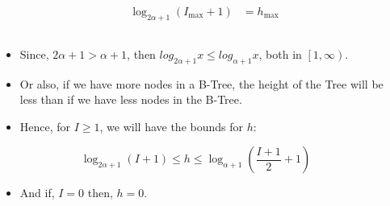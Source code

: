 \begin{frame}
\begin{columns}
\begin{column}{0.5\textwidth}
\[\begin{aligned}
                    \log_{2\alpha + 1} \left(I_{\text{max}} + 1\right) &= h_{\text{max}}
                \end{aligned}
            \]
        \end{column}
    \end{columns}
    \framebreak{}
    \begin{columns}
        \begin{column}{\textlecolumn}
            \begin{block}{}
                \begin{itemize}
                    \item Since, \(2\alpha + 1 > \alpha + 1\), then \(log_{2\alpha + 1} x \leq log_{\alpha + 1}x\), both in \(\left[1, \infty\right)\).
                    \item Or also, if we have more nodes in a B-Tree, the height of the Tree will be less than if we have less nodes in the B-Tree.
                    \item Hence, for \(I \geq 1\), we will have the bounds for \(h\):
                \end{itemize}
                \[
                    \log_{2\alpha + 1}\left(I + 1\right)
                    \leq
                    h
                    \leq
                    \log_{\alpha + 1}\left(\frac{I + 1}{2} + 1\right)
                \]
                \begin{itemize}
                    \item And if, \(I = 0\) then, \(h = 0\).
                \end{itemize}
            \end{block}
        \end{column}
        \begin{column}{\textricolumn}
        \end{column}
    \end{columns}
\end{frame}
